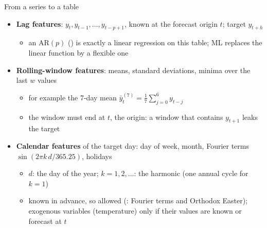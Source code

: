 \begin{frame}{From a series to a table}
\itemsize{\small}
\begin{itemize}
    \item \textbf{Lag features}: $y_{t}, y_{t-1}, \dots, y_{t-p+1}$, known at the forecast origin $t$; target $y_{t+h}$
    \begin{itemize}
        \item an AR$(p)$ () is exactly a linear regression on this table; ML replaces the linear function by a flexible one
    \end{itemize}
    \item \textbf{Rolling-window features}: means, standard deviations, minima over the last $w$ values
    \begin{itemize}
        \item for example the 7-day mean $\bar y_t^{(7)} = \frac{1}{7}\sum_{j=0}^{6} y_{t-j}$
        \item the window must end at $t$, the origin: a window that contains $y_{t+1}$ leaks the target
    \end{itemize}
    \item \textbf{Calendar features} of the target day: day of week, month, Fourier terms $\sin(2\pi k\,d/365.25)$, holidays
    \begin{itemize}
        \item $d$: the day of the year; $k = 1, 2, \dots$: the harmonic (one annual cycle for $k = 1$)
        \item known in advance, so allowed (: Fourier terms and Orthodox Easter); exogenous variables (temperature) only if their values are known or forecast at $t$
    \end{itemize}
\end{itemize}
\end{frame}

